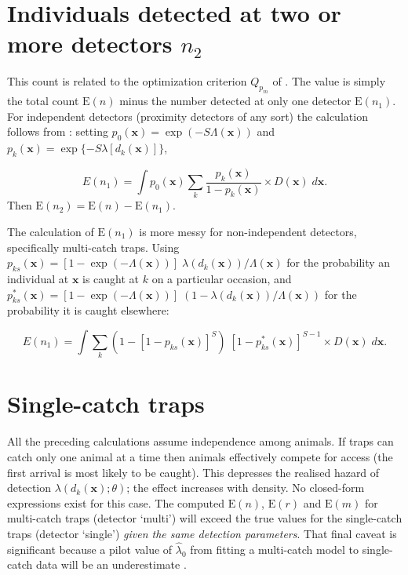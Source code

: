 \documentclass[
]{book}
\begin{document}
\section{\texorpdfstring{Individuals detected at two or more detectors \(n_2\)}{Individuals detected at two or more detectors n\_2}}\label{individuals-detected-at-two-or-more-detectors-n_2}

This count is related to the optimization criterion \(Q_{p_m}\) of \citet{drns21}. The value is simply the total count \(\mbox{E}(n)\) minus the number detected at only one detector \(\mbox{E}(n_1)\). For
independent detectors (proximity detectors of any sort) the calculation follows from \citet{drns21}: setting \(p_0(\mathbf{x}) = \exp (-S\Lambda(\mathbf{x}))\) and \(p_k(\mathbf{x}) = \exp\{-S \lambda[d_k(\mathbf{x})]\}\),

\[E(n_1) = \int p_0(\mathbf{x}) \sum_k \frac{p_k(\mathbf{x})}{1 - p_k(\mathbf{x})} \times D(\mathbf{x}) \; d \mathbf{x}.\]
Then \(\mbox{E}(n_2) = \mbox{E}(n) - \mbox{E}(n_1)\).

The calculation of \(\mbox{E}(n_1)\) is more messy for non-independent detectors, specifically multi-catch traps. Using \(p_{ks}(\mathbf{x}) = [1 - \exp(-\Lambda(\mathbf{x}))] \; \lambda(d_k(\mathbf{x})) / \Lambda(\mathbf{x})\) for the probability an individual at \(\mathbf{x}\) is caught at \(k\) on a particular occasion, and \(p^*_{ks}(\mathbf{x}) = [1 - \exp(-\Lambda(\mathbf{x}))] \; (1 - \lambda(d_k(\mathbf{x})) / \Lambda(\mathbf{x}))\) for the probability it is caught elsewhere:

\[E(n_1) = \int \sum_k \left( 1 - [1-p_{ks}(\mathbf{x})]^S \right) \;  [1-p^*_{ks}(\mathbf{x})]^{S-1} \times D(\mathbf{x}) \; d \mathbf{x}.\]

\section{Single-catch traps}\label{single-catch-traps}

All the preceding calculations assume independence among animals. If traps can catch only one animal at a time then animals effectively compete for access (the first arrival is most likely to be caught). This depresses the realised hazard of detection \(\lambda(d_k(\mathbf{x}); \theta)\); the effect increases with density. No closed-form expressions exist for this case. The computed \(\mbox{E}(n)\), \(\mbox{E}(r)\) and \(\mbox{E}(m)\) for multi-catch traps (detector `multi') will exceed the true values for the single-catch traps (detector `single') \emph{given the same detection parameters}. That final caveat is significant because a pilot value of \(\hat \lambda_0\) from fitting a multi-catch model to single-catch data will be an underestimate \citep{ebb09}.
\end{document}
